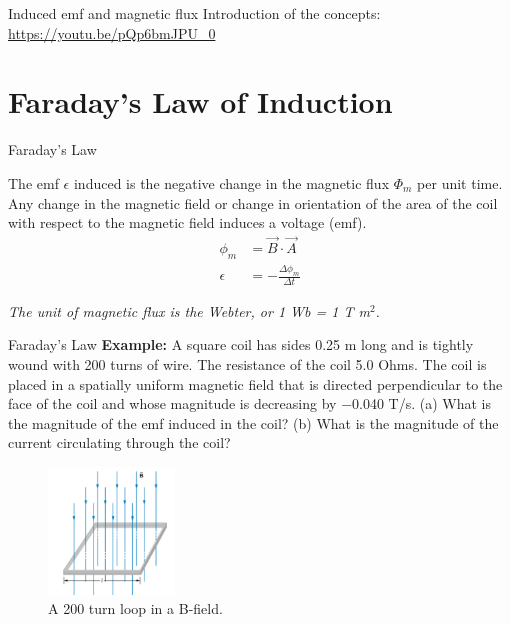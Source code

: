 \documentclass{beamer}
\begin{document}
\begin{frame}{Induced emf and magnetic flux}
Introduction of the concepts:
\url{https://youtu.be/pQp6bmJPU_0}
\end{frame}

\section{Faraday's Law of Induction}

\begin{frame}{Faraday's Law}
\begin{tcolorbox}[colback=white,colframe=black!40!black,title=Faraday's Law]
\alert{The emf $\epsilon$ induced is the negative change in the magnetic flux $\Phi_m$ per unit time. Any change in the magnetic field
or change in orientation of the area of the coil with respect to the magnetic field induces a voltage (emf).
\begin{align}
\phi_m &= \vec{B} \cdot \vec{A} \\
\epsilon &= - \frac{\Delta\phi_m}{\Delta t}
\label{eq:farad}
\end{align}}
\end{tcolorbox}
\textit{The unit of magnetic flux is the Webter, or 1 Wb = 1 T m$^2$.}
\end{frame}

\begin{frame}{Faraday's Law}
\small
\textbf{Example:}
A square coil has sides 0.25 m long and is tightly wound with 200 turns of wire. The resistance of the coil 5.0 Ohms. The coil is placed in a spatially uniform magnetic field that is directed perpendicular to the face of the coil and whose magnitude is decreasing by −0.040 T/s. (a) What is the magnitude of the emf induced in the coil? (b) What is the magnitude of the current circulating through the coil?
\begin{figure}
\centering
\includegraphics[width=0.3\textwidth]{figures/loop1.png}
\caption{\label{fig:loop1} A 200 turn loop in a B-field.}
\end{figure}
\end{frame}
\end{document}
